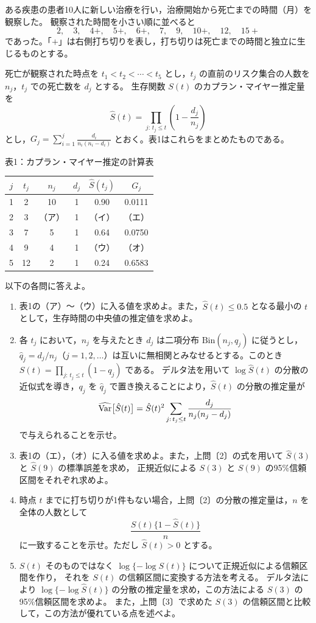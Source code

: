 \documentclass[a4paper,10pt]{ltjsarticle}
\begin{document}
ある疾患の患者10人に新しい治療を行い，治療開始から死亡までの時間（月）を観察した。
観察された時間を小さい順に並べると
\[
2,\quad 3,\quad 4+,\quad 5+,\quad 6+,\quad 7,\quad 9,\quad 10+,\quad 12,\quad 15+
\]
であった。「$+$」は右側打ち切りを表し，打ち切りは死亡までの時間と独立に生じるものとする。

死亡が観察された時点を $t_1<t_2<\cdots<t_5$ とし，$t_j$ の直前のリスク集合の人数を $n_j$，$t_j$ での死亡数を $d_j$ とする。
生存関数 $S(t)$ のカプラン・マイヤー推定量を
\[
\hat S(t)=\prod_{j:\,t_j\le t}\left(1-\frac{d_j}{n_j}\right)
\]
とし，$G_j=\displaystyle\sum_{i=1}^{j}\frac{d_i}{n_i(n_i-d_i)}$ とおく。表1はこれらをまとめたものである。
\begin{center}
表1：カプラン・マイヤー推定の計算表\par\smallskip
\begin{tabular}{cccccc}
\toprule
$j$ & $t_j$ & $n_j$ & $d_j$ & $\hat S(t_j)$ & $G_j$\\
\midrule
1 & 2 & 10 & 1 & 0.90 & 0.0111\\
2 & 3 & （ア） & 1 & （イ） & （エ）\\
3 & 7 & 5 & 1 & 0.64 & 0.0750\\
4 & 9 & 4 & 1 & （ウ） & （オ）\\
5 & 12 & 2 & 1 & 0.24 & 0.6583\\
\bottomrule
\end{tabular}
\end{center}
以下の各問に答えよ。
\begin{enumerate}
\item 表1の（ア）〜（ウ）に入る値を求めよ。また，$\hat S(t)\le0.5$ となる最小の $t$ として，生存時間の中央値の推定値を求めよ。
\item 各 $t_j$ において，$n_j$ を与えたとき $d_j$ は二項分布 $\mathrm{Bin}(n_j,q_j)$ に従うとし，
$\hat q_j=d_j/n_j$（$j=1,2,\ldots$）は互いに無相関とみなせるとする。このとき $S(t)=\prod_{j:\,t_j\le t}(1-q_j)$ である。
デルタ法を用いて $\log\hat S(t)$ の分散の近似式を導き，$q_j$ を $\hat q_j$ で置き換えることにより，$\hat S(t)$ の分散の推定量が
\[
\widehat{\operatorname{Var}}\bigl[\hat S(t)\bigr]=\hat S(t)^2\sum_{j:\,t_j\le t}\frac{d_j}{n_j(n_j-d_j)}
\]
で与えられることを示せ。
\item 表1の（エ），（オ）に入る値を求めよ。また，上問〔2〕の式を用いて $\hat S(3)$ と $\hat S(9)$ の標準誤差を求め，
正規近似による $S(3)$ と $S(9)$ の95\%信頼区間をそれぞれ求めよ。
\item 時点 $t$ までに打ち切りが1件もない場合，上問〔2〕の分散の推定量は，$n$ を全体の人数として
\[
\frac{\hat S(t)\{1-\hat S(t)\}}{n}
\]
に一致することを示せ。ただし $\hat S(t)>0$ とする。
\item $S(t)$ そのものではなく $\log\{-\log S(t)\}$ について正規近似による信頼区間を作り，
それを $S(t)$ の信頼区間に変換する方法を考える。
デルタ法により $\log\{-\log\hat S(t)\}$ の分散の推定量を求め，この方法による $S(3)$ の95\%信頼区間を求めよ。
また，上問〔3〕で求めた $S(3)$ の信頼区間と比較して，この方法が優れている点を述べよ。
\end{enumerate}
\newpage
\end{document}
